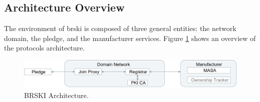 \subsection{Architecture Overview}

The environment of \gls{brski} is composed of three general entities: the network domain, the pledge, and the manufacturer services. Figure \ref{brski-architecture} shows an overview of the protocols architecture.

\begin{figure}[H]
	\centering
	\includegraphics[scale=0.4]{Images/brski-overview.png}
	\caption{BRSKI Architecture.}
	\label{brski-architecture}
\end{figure}

